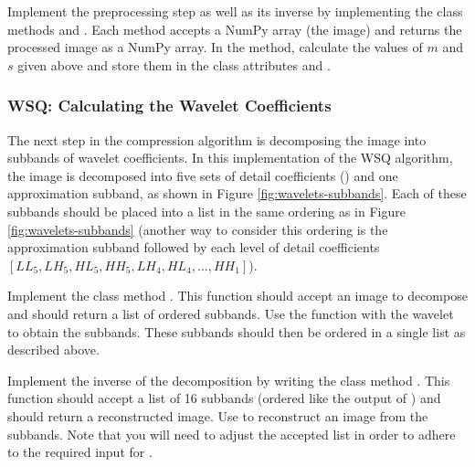 \begin{comment}
To get the mean, min, and max of an array, and the max of two elements,
we use the following commands:
\begin{lstlisting}
>>> # assume we have an array M, numerical values a and b
>>> M.mean()
>>> M.max()
>>> M.min()
>>> max(a,b)
\end{lstlisting}
\end{comment}

\begin{problem}
Implement the preprocessing step as well as its inverse by implementing the class methods  and .
Each method accepts a NumPy array (the image) and returns the processed image as a NumPy array.
In the  method, calculate the values of $m$ and $s$ given above and store them in the class attributes  and .
\end{problem}

\subsubsection*{WSQ: Calculating the Wavelet Coefficients}
The next step in the compression algorithm is decomposing the image into subbands of wavelet coefficients.
In this implementation of the WSQ algorithm, the image is decomposed into five sets of detail coefficients () and one approximation subband, as shown in Figure \ref{fig:wavelets-subbands}.
Each of these subbands should be placed into a list in the same ordering as in Figure \ref{fig:wavelets-subbands} (another way to consider this ordering is the approximation subband followed by
each level of detail coefficients $[LL_5, LH_5, HL_5, HH_5, LH_4, HL_4,\dots ,HH_1]$).

\begin{problem}
Implement the class method .
This function should accept an image to decompose and should return a list of ordered subbands.
Use the function  with the  wavelet to obtain the subbands.
These subbands should then be ordered in a single list as described above.

Implement the inverse of the decomposition by writing the class method .
This function should accept a list of 16 subbands (ordered like the output of ) and should return a reconstructed image.
Use  to reconstruct an image from the subbands.
Note that you will need to adjust the accepted list in order to adhere to the required input for .
\end{problem}

